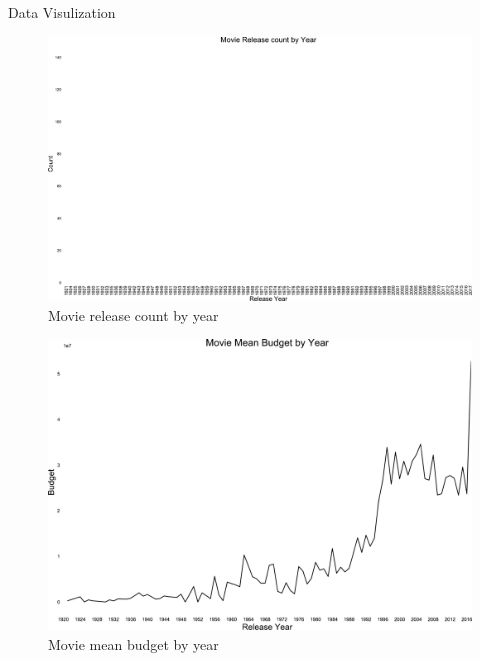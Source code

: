 \documentclass[
 size=12pt,
 paper=smartboard, %
 mode=present, %
 display=slides, %
style=tuliplab,
pauseslide,
fleqn,leqno]{powerdot}
\begin{document}
\begin{slide}{ Data Visulization}
	
	\begin{figure}[ht]%
		\centering%
		\includegraphics[scale=0.05]{logos/3.eps}
		\caption{Movie release count by year}%
	\end{figure}
	
	\begin{figure}[ht]%
		\centering%
		\includegraphics[scale=0.2]{logos/4.eps}
		\caption{Movie mean budget by year}%
	\end{figure}


\end{slide}
\end{document}
